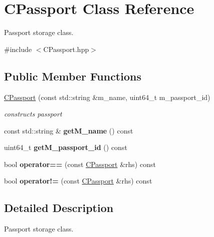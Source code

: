 \hypertarget{classCPassport}{}\section{C\+Passport Class Reference}
\label{classCPassport}


Passport storage class.  




{\ttfamily \#include $<$C\+Passport.\+hpp$>$}

\subsection*{Public Member Functions}
\begin{DoxyCompactItemize}
\item 
\hyperlink{classCPassport_ad5ac403b1623077dc600f1deb13cd0cb}{C\+Passport} (const std\+::string \&m\+\_\+name, uint64\+\_\+t m\+\_\+passport\+\_\+id)
\begin{DoxyCompactList}\small\item\em constructs passport \end{DoxyCompactList}\item 
const std\+::string \& {\bfseries get\+M\+\_\+name} () const \hypertarget{classCPassport_a87d76b76965409c8ad75675de048f427}{}\label{classCPassport_a87d76b76965409c8ad75675de048f427}

\item 
uint64\+\_\+t {\bfseries get\+M\+\_\+passport\+\_\+id} () const \hypertarget{classCPassport_a29c7e4db3470b967951ce64fa0caf9af}{}\label{classCPassport_a29c7e4db3470b967951ce64fa0caf9af}

\item 
bool {\bfseries operator==} (const \hyperlink{classCPassport}{C\+Passport} \&rhs) const \hypertarget{classCPassport_aac134efa92c46194ed82fa8ed722fbae}{}\label{classCPassport_aac134efa92c46194ed82fa8ed722fbae}

\item 
bool {\bfseries operator!=} (const \hyperlink{classCPassport}{C\+Passport} \&rhs) const \hypertarget{classCPassport_a4eaf3dc10628903c5018b0238c378020}{}\label{classCPassport_a4eaf3dc10628903c5018b0238c378020}

\end{DoxyCompactItemize}


\subsection{Detailed Description}
Passport storage class. 

